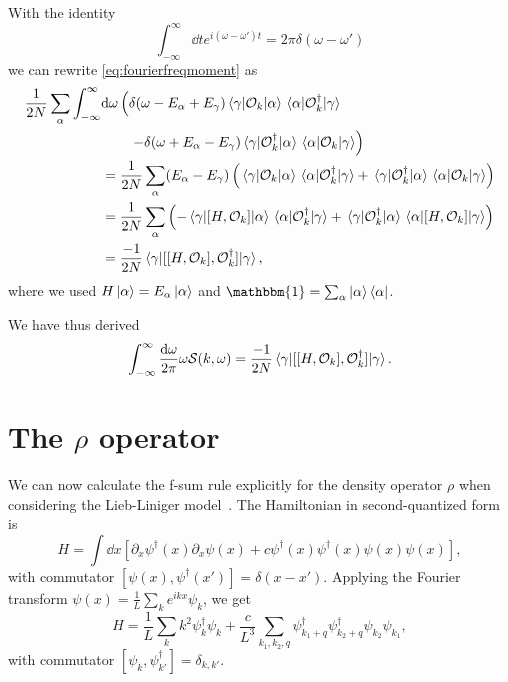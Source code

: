 \documentclass[11pt, a4paper]{report} %
\begin{document}
With the identity
\begin{equation}
  \int_{-\infty}^{\infty} \dd t e^{i(\omega-\omega')t} = 2\pi \delta(\omega-\omega')
\end{equation}
we can rewrite \cref{eq:fourierfreqmoment} as 
\begin{align}
  \frac{1}{2N} \sum_{\alpha} \int_{-\infty}^{\infty}&\dd \omega  \left(\delta(\omega-E_{\alpha}+E_{\gamma})\matrixel{\gamma}{\mathcal{O}_k}{\alpha}\matrixel{\alpha}{\mathcal{O}_{k}^{\dagger}}{\gamma}\right. \nonumber\\
&\qquad\left.- \delta(\omega+E_{\alpha}-E_{\gamma})\matrixel{\gamma}{\mathcal{O}_{k}^{\dagger}}{\alpha}\matrixel{\alpha}{\mathcal{O}_k}{\gamma}\right)\\
&=\frac{1}{2N} \sum_{\alpha} (E_{\alpha} - E_{\gamma}) \left(\matrixel{\gamma}{\mathcal{O}_k}{\alpha}\matrixel{\alpha}{\mathcal{O}_{k}^{\dagger}}{\gamma} + \matrixel{\gamma}{\mathcal{O}_{k}^{\dagger}}{\alpha}\matrixel{\alpha}{\mathcal{O}_k}{\gamma}\right)\\
&=\frac{1}{2N} \sum_{\alpha}  \left(-\matrixel{\gamma}{[H,\mathcal{O}_k]}{\alpha}\matrixel{\alpha}{\mathcal{O}_{k}^{\dagger}}{\gamma} + \matrixel{\gamma}{\mathcal{O}_{k}^{\dagger}}{\alpha}\matrixel{\alpha}{[H,\mathcal{O}_k]}{\gamma}\right)\\
&=\frac{-1}{2N} \matrixel{\gamma}{[[H,\mathcal{O}_k],\mathcal{O}_{k}^{\dagger}]}{\gamma},
\end{align}
where we used \(H\ket{\alpha}=E_{\alpha}\ket{\alpha}\) and \(\mathbbm{1}=\sum_{\alpha}\ket{\alpha}\bra{\alpha}\).

We have thus derived~\cite{Cauxfsum}
\begin{align}
  \int_{-\infty}^{\infty}\frac{\dd \omega}{2\pi} \omega \mathcal{S}(k,\omega) = \frac{-1}{2N} \matrixel{\gamma}{[[H,\mathcal{O}_k],\mathcal{O}_{k}^{\dagger}]}{\gamma}.
\end{align}


\section{The $\rho$ operator}

\begin{sloppypar}
We can now calculate the f-sum rule explicitly for the density operator \(\rho\) when considering the Lieb-Liniger model~\cite{Cauxfsum}.
The Hamiltonian in second-quantized form is~\cite{Franchini2017} 
\begin{equation}
  \label{eq:1}
  H = \int \dd x \left[\partial_x\psi^{\dag}(x) \partial_{x} \psi(x) + c \psi^{\dag}(x)\psi^{\dag}(x)\psi(x)\psi(x)\right],
\end{equation}
with commutator \([\psi(x), \psi^{\dagger}(x')] = \delta(x-x')\).
Applying the Fourier transform \(\psi (x) = \frac{1}{L}\sum_{k} e^{ikx}\psi_k\), we get
\begin{equation}
  \label{eq:2}
  H = \frac{1}{L} \sum_k k^2 \psi^{\dagger}_{k}\psi_k +\frac{c}{L^3} \sum_{k_1,k_2,q} \psi^{\dag}_{k_1+q} \psi^{\dag}_{k_2+q} \psi_{k_2} \psi_{k_1},
\end{equation}
with commutator \([\psi_k,\psi_{k'}^{\dag}]=\delta_{k,k'}\).
\end{sloppypar}
\end{document}
